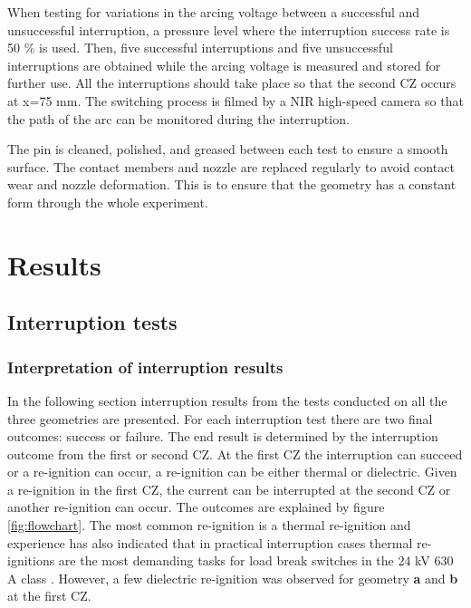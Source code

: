\documentclass[10pt,b5paper,twoside]{article}
\begin{document}
When testing for variations in the arcing voltage between a successful and unsuccessful interruption, a pressure level where the interruption success rate is 50 \% is used. Then, five successful interruptions and five unsuccessful interruptions are obtained while the arcing voltage is measured and stored for further use. All the interruptions should take place so that the second CZ occurs at x=75 mm. The switching process is filmed by a NIR high-speed camera so that the path of the arc can be monitored during the interruption.

The pin is cleaned, polished, and greased between each test to ensure a smooth surface. The contact members and nozzle are replaced regularly to avoid contact wear and nozzle deformation. This is to ensure that the geometry has a constant form through the whole experiment.
\cleardoublepage

\section{Results}
\subsection{Interruption tests}
\subsubsection{Interpretation of interruption results}
In the following section interruption results from the tests conducted on all the three geometries are presented. For each interruption test there are two final outcomes: success or failure. The end result is determined by the interruption outcome from the first or second CZ. At the first CZ the interruption can succeed or a re-ignition can occur, a re-ignition can be either thermal or dielectric. Given a re-ignition in the first CZ, the current can be interrupted at the second CZ or another re-ignition can occur. The outcomes are explained by figure \ref{fig:flowchart}. The most common re-ignition is a thermal re-ignition and experience has also indicated that in practical interruption cases thermal re-ignitions are the most demanding tasks for load break switches in the 24 kV 630 A class \cite{bib:AFIMVLBA}. However, a few dielectric re-ignition was observed for geometry \textbf{a} and \textbf{b} at the first CZ. 
\end{document}
